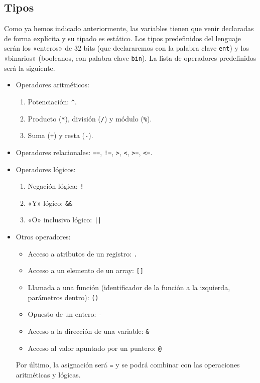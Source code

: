 \subsection{Tipos}
Como ya hemos indicado anteriormente, las variables tienen que venir declaradas
de forma explícita y su tipado es estático. Los tipos predefinidos del lenguaje
serán los «enteros» de $32$ bits (que declararemos con la palabra clave
\lstinline{ent}) y los «binarios» (booleanos, con palabra clave
\lstinline{bin}). La lista de operadores predefinidos será la siguiente.
\begin{itemize}
\item Operadores aritméticos:
    \begin{enumerate}
        \item Potenciación: \lstinline{^}.
        \item Producto (\lstinline{*}), división (\lstinline{/}) y módulo (\lstinline{%}).
        \item Suma (\lstinline{+}) y resta (\lstinline{-}).
    \end{enumerate}
\item Operadores relacionales: \lstinline{==}, \lstinline{!=}, \lstinline{>}, \lstinline{<},
    \lstinline{>=}, \lstinline{<=}.

\item Operadores lógicos:
\begin{enumerate}
    \item Negación lógica: \lstinline{!}
    \item «Y» lógico: \lstinline{&&}
    \item «O» inclusivo lógico: \lstinline{||}
\end{enumerate}

\item Otros operadores:
\begin{itemize}
    \item Acceso a atributos de un registro: \lstinline{.}
    \item Acceso a un elemento de un array: \lstinline{[]}
    \item Llamada a una función (identificador de la función a la izquierda,
        parámetros dentro): \lstinline{()}
    \item Opuesto de un entero: \lstinline{-}
    \item Acceso a la dirección de una variable: \lstinline{&}
    \item Acceso al valor apuntado por un puntero: \lstinline{@}
\end{itemize}
Por último, la asignación será \lstinline{=} y se podrá combinar con las
operaciones aritméticas y lógicas.
\end{itemize}
